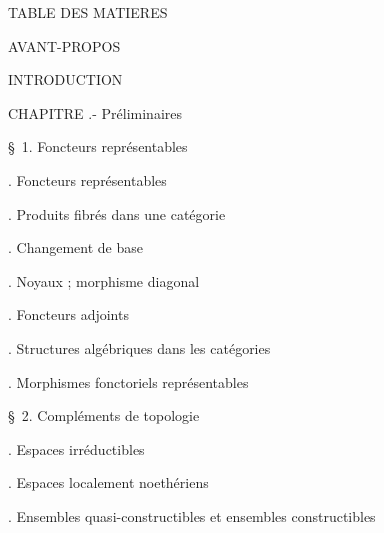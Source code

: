 
\begin{center}
TABLE DES MATIERES
\end{center}

\noindent AVANT-PROPOS \dotfill

\noindent INTRODUCTION\dotfill

\noindent CHAPITRE  .- Préliminaires\dotfill

\noindent\quad \S\ 1. Foncteurs représentables\dotfill

\noindent{}. Foncteurs représentables\dotfill

\noindent{}. Produits fibrés dans une catégorie\dotfill

\noindent{}. Changement de base\dotfill

\noindent{}. Noyaux ; morphisme diagonal\dotfill

\noindent{}. Foncteurs adjoints\dotfill

\noindent{}. Structures algébriques dans les catégories\dotfill

\noindent{}. Morphismes fonctoriels représentables\dotfill

\noindent\quad \S\ 2. Compléments de topologie\dotfill

\noindent{}. Espaces irréductibles\dotfill

\noindent{}. Espaces localement noethériens\dotfill

\noindent{}. Ensembles quasi-constructibles et ensembles constructibles\dotfill

